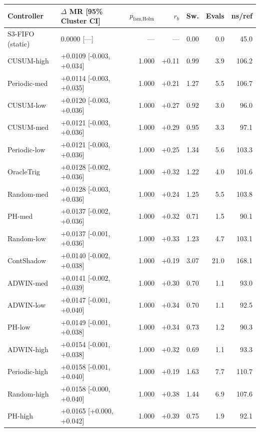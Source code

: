 \begin{tabular}{llrrrrr}
\toprule
Controller & $\Delta$ MR [95\% Cluster CI] & $p_{\text{fam,Holm}}$ & $r_b$ & Sw. & Evals & ns/ref \\
\midrule
S3-FIFO (static) & 0.0000 [---] & --- & --- & 0.00 & 0.0 & 45.0 \\
\midrule
CUSUM-high & +0.0109 [-0.003, +0.034] & 1.000 & +0.11 & 0.99 & 3.9 & 106.2 \\
Periodic-med & +0.0114 [-0.003, +0.035] & 1.000 & +0.21 & 1.27 & 5.5 & 106.7 \\
CUSUM-low & +0.0120 [-0.003, +0.036] & 1.000 & +0.27 & 0.92 & 3.0 & 96.0 \\
CUSUM-med & +0.0121 [-0.003, +0.036] & 1.000 & +0.29 & 0.95 & 3.3 & 97.1 \\
Periodic-low & +0.0121 [-0.003, +0.036] & 1.000 & +0.25 & 1.34 & 5.6 & 103.3 \\
OracleTrig & +0.0128 [-0.002, +0.036] & 1.000 & +0.32 & 1.22 & 4.0 & 101.6 \\
Random-med & +0.0128 [-0.003, +0.036] & 1.000 & +0.24 & 1.25 & 5.5 & 103.8 \\
PH-med & +0.0137 [-0.002, +0.036] & 1.000 & +0.32 & 0.71 & 1.5 & 90.1 \\
Random-low & +0.0137 [-0.001, +0.036] & 1.000 & +0.33 & 1.23 & 4.7 & 103.1 \\
ContShadow & +0.0140 [-0.002, +0.038] & 1.000 & +0.19 & 3.07 & 21.0 & 168.1 \\
ADWIN-med & +0.0141 [-0.002, +0.039] & 1.000 & +0.30 & 0.70 & 1.1 & 93.0 \\
ADWIN-low & +0.0147 [-0.001, +0.040] & 1.000 & +0.34 & 0.70 & 1.1 & 92.5 \\
PH-low & +0.0149 [-0.001, +0.038] & 1.000 & +0.34 & 0.73 & 1.2 & 90.3 \\
ADWIN-high & +0.0154 [-0.001, +0.038] & 1.000 & +0.32 & 0.69 & 1.1 & 93.3 \\
Periodic-high & +0.0158 [-0.001, +0.040] & 1.000 & +0.19 & 1.63 & 7.7 & 110.7 \\
Random-high & +0.0158 [-0.000, +0.040] & 1.000 & +0.38 & 1.44 & 6.9 & 107.6 \\
PH-high & +0.0165 [+0.000, +0.042] & 1.000 & +0.39 & 0.75 & 1.9 & 92.1 \\
\bottomrule
\end{tabular}

